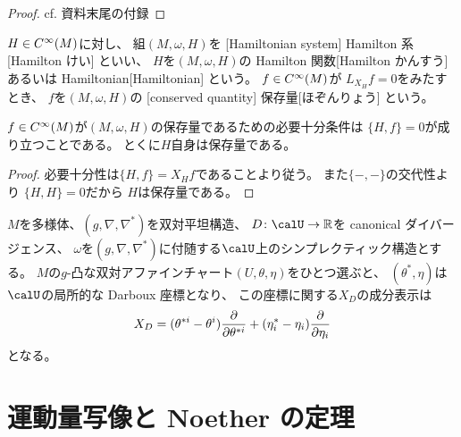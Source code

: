 \documentclass[report,dvipdfmx]{jlreq}
\begin{document}
\begin{proof}
    cf. 資料末尾の付録
\end{proof}


\begin{definition}[Hamilton 系]
    $H \in C^\infty(M)$に対し、
    組$(M, \omega, H)$を
    [Hamiltonian system]
        {Hamilton 系}[Hamilton けい]
    といい、
    $H$を$(M, \omega, H)$の
        {Hamilton 関数}[Hamilton かんすう]
    あるいは
        {Hamiltonian}[Hamiltonian]
    という。
    $f \in C^\infty(M)$が
    $L_{X_H} f = 0$をみたすとき、
    $f$を$(M, \omega, H)$の
    [conserved quantity]
        {保存量}[ほぞんりょう]
    という。
\end{definition}

\begin{proposition}
    $f \in C^\infty(M)$が$(M, \omega, H)$の保存量であるための必要十分条件は
    $\{ H, f \} = 0$が成り立つことである。
    とくに$H$自身は保存量である。
\end{proposition}

\begin{proof}
    必要十分性は$\{ H, f \} = X_H f$であることより従う。
    また$\{ {-}, {-} \}$の交代性より
    $\{ H, H \} = 0$だから
    $H$は保存量である。
\end{proof}

\begin{example}
    $M$を多様体、$(g, \nabla, \nabla^*)$を双対平坦構造、
    $D \colon \calU \to \R$を canonical ダイバージェンス、
    $\omega$を$(g, \nabla, \nabla^*)$に付随する$\calU$上のシンプレクティック構造とする。
    $M$の$g$-凸な双対アファインチャート$(U, \theta, \eta)$をひとつ選ぶと、
    $(\theta^*, \eta)$は$\calU$の局所的な Darboux 座標となり、
    この座標に関する$X_D$の成分表示は
    \begin{equation}
        X_D
            =
                (\theta^{*i} - \theta^i) \deldel{\theta^{*i}}
                +
                (\eta^*_i - \eta_i) \deldel{\eta_i}
    \end{equation}
    となる。
\end{example}

%
\section{運動量写像と Noether の定理}
\end{document}

